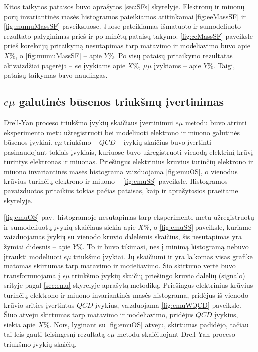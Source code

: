 \documentclass[a4paper, 12pt]{article}
\newcommand{\emu}{e\mu}
\newcommand{\mumu}{\mu\mu}
\newcommand{\QCD}{QC\! D}
\begin{document}
Kitos taikytos pataisos buvo aprašytos \ref{sec:SFs} skyrelyje.
Elektronų ir miuonų porų invariantinės masės histogramos pateikiamos atitinkamai \ref{fig:eeMassSF} ir \ref{fig:mumuMassSF}
paveiksluose.
Juose pateikiamas išmatuoto ir sumodeliuoto rezultato palyginimas prieš ir po minėtų pataisų takymo.
\ref{fig:eeMassSF} paveiksle prieš korekcijų pritaikymą nesutapimas tarp matavimo ir modeliavimo buvo apie $X\%$, o
\ref{fig:mumuMassSF} -- apie $Y\%$.
Po visų pataisų pritaikymo rezultatas akivaizdžiai pagerėjo -- $ee$ įvykiams apie $X\%$, $\mumu$ įvykiams -- apie $Y\%$.
Taigi, pataisų taikymas buvo naudingas.


\subsection{$e\mu$ galutinės būsenos triukšmų įvertinimas}

Drell-Yan proceso triukšmo įvykių skaičiaus įvertinimui $\emu$ metodu buvo atrinti eksperimento metu užregistruoti bei
modeliuoti elektrono ir miuono galutinės būsenos įvykiai.
$\emu$ triukšmo -- $\QCD$ -- įvykių skaičius buvo įvertinti pasinaudojant tokiais įvykiais, kuriuose buvo užregistruoti
vienodą elektrinį krūvį turintys elektronas ir miuonas.
Priešingus elektrinius krūvius turinčių elektrono ir miuono invariantinės masės histograma vaizduojama \ref{fig:emuOS},
o vienodus krūvius turinčių elektrono ir miuono -- \ref{fig:emuSS} paveiksle.
Histogramos pavaizduotos pritaikius tokias pačias pataisas, kaip ir aprašytosios praeitame skyrelyje.

\ref{fig:emuOS} pav.\ histogramoje nesutapimas tarp eksperimento metu užregistruotų ir sumodeliuotų įvykių skaičiaus siekia
apie $X\%$, o \ref{fig:emuSS} paveiksle, kuriame vaizduojamas įvykių su vienodo krūvio dalelėmis skaičius, šis nesutapimas
yra žymiai didesnis -- apie $Y\%$.
To ir buvo tikimasi, nes į minimą histogramą nebuvo įtraukti modeliuoti $\emu$ triukšmo įvykiai.
Jų skaičiumi ir yra laikomas visas grafike matomas skirtumas tarp matavimo ir modeliavimo.
Šio skirtumo vertė buvo transformuojama į $\emu$ triukšmo įvykių skaičių priešingo krūvio dalelių (signalo) srityje pagal
\ref{sec:emu} skyrelyje aprašytą metodiką.
Priešingus elektrinius krūvius turinčių elektrono ir miuono invariantinės masės histograma, pridėjus iš vienodo krūvio srities
įvertintus $\QCD$ įvykius, vaizduojama \ref{fig:emuWQCD} paveiksle.
Šiuo atveju skirtumas tarp matavimo ir modeliavimo, pridėjus $\QCD$ įvykius, siekia apie $X\%$.
Nors, lyginant su \ref{fig:emuOS} atveju, skirtumas padidėjo, tačiau tai leis gauti teisingesnį rezultatą $\emu$ metodu
skaičiuojant Drell-Yan proceso triukšmo įvykių skaičių.
\end{document}
